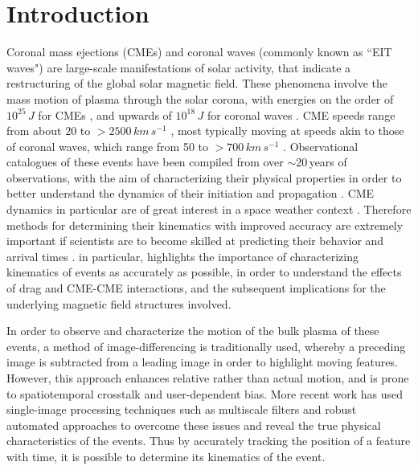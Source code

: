 \documentclass[structabstract]{aa}
\begin{document}
\maketitle

%

\section{Introduction}
\label{sect_intro}

Coronal mass ejections (CMEs) and coronal waves (commonly known as ``EIT waves") are large-scale manifestations of solar activity, that indicate a restructuring of the global solar magnetic field. These phenomena involve the mass motion of plasma through the solar corona, with energies on the order of $10^{25}\,J$ for CMEs \citep{2004JGRA..10910104E}, and upwards of $10^{18}\,J$ for coronal waves \citep{2005ApJ...633L.145B}. CME speeds range from about 20 to $>2500\,km\,s^{-1}$ \citep{2004JGRA..10907105Y}, most typically moving at speeds akin to those of coronal waves, which range from 50 to $>700\,km\,s^{-1}$ \citep{2009ApJS..183..225T}. Observational catalogues of these events have been compiled from over $\sim$20\,years of observations, with the aim of characterizing their physical properties in order to better understand the dynamics of their initiation and propagation \citep[see the recent reviews by e.g., ][]{2011SSRv..158..365G,2012SoPh..tmp...93P,2011ASSL..376.....H,2012LRSP....9....3W}. CME dynamics in particular are of great interest in a space weather context \citep[e.g.,][]{SWE:SWE493, 2010heliophysics, 2005A&A...440..373H}. Therefore methods for determining their kinematics with improved accuracy are extremely important if scientists are to become skilled at predicting their behavior and arrival times \citep[see, for example, efforts by][]{2010NatCo...1E..74B, 2005AnGeo..23.1033S, 2004Natur.432...78P}. \citet{2012ApJ...749...57T} in particular, highlights the importance of characterizing kinematics of events as accurately as possible, in order to understand the effects of drag and CME-CME interactions, and the subsequent implications for the underlying magnetic field structures involved.

In order to observe and characterize the motion of the bulk plasma of these events, a method of image-differencing is traditionally used, whereby a preceding image is subtracted from a leading image in order to highlight moving features. However, this approach enhances relative rather than actual motion, and is prone to spatiotemporal crosstalk and user-dependent bias. More recent work has used single-image processing techniques such as multiscale filters \citep{2011AdSpR..47.2118G, 2009A&A...495..325B, 2008SoPh..248..457Y} and robust automated approaches \citep[e.g.,][]{2012ApJ...752..145B, 2012SoPh..276..479P, 2011A&A...531A..42L} to overcome these issues and reveal the true physical characteristics of the events. Thus by accurately tracking the position of a feature with time, it is possible to determine its kinematics of the event. 
\end{document}
